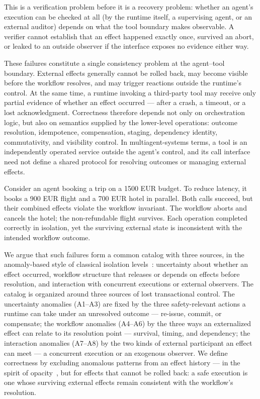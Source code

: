 \documentclass[runningheads]{comsis3}
\begin{document}
This is a verification problem before it is a recovery problem: whether an
agent's execution can be checked at all (by the runtime itself, a supervising agent, or an external auditor) depends on what the tool
boundary makes observable. A verifier cannot establish that an effect
happened exactly once, survived an abort, or leaked to an outside observer
if the interface exposes no evidence either way.

These failures constitute a single consistency problem at the agent--tool
boundary. External effects
generally cannot be rolled back, may become visible before the workflow
resolves, and may trigger reactions outside the runtime's control. At the
same time, a runtime invoking a third-party tool may receive only partial
evidence of whether an effect occurred --- after a crash, a timeout, or a
lost acknowledgment. Correctness therefore depends not only on
orchestration logic, but also on semantics supplied by the lower-level
operations: outcome resolution, idempotence, compensation, staging,
dependency identity, commutativity, and visibility control. In
multiagent-systems terms, a tool is an independently operated service
outside the agent's control, and its call interface need not define a
shared protocol for resolving outcomes or managing external effects.

Consider an agent booking a trip on a 1500 EUR budget. To reduce latency,
it books a 900 EUR flight and a 700 EUR hotel in parallel. Both calls
succeed, but their combined effects violate the workflow invariant. The
workflow aborts and cancels the hotel; the non-refundable flight survives.
Each operation completed correctly in isolation, yet the surviving external
state is inconsistent with the intended workflow outcome.

We argue that such failures form a common catalog with three sources, in
the anomaly-based style of classical isolation
levels~\cite{berenson1995critique,adya1999}: uncertainty about whether an
effect occurred, workflow structure that releases or depends on effects
before resolution, and interaction with concurrent executions or external
observers. The catalog is organized around three sources of lost
transactional control. The uncertainty anomalies (A1--A3) are fixed by the three
safety-relevant actions a runtime can take under an unresolved outcome ---
re-issue, commit, or compensate; the workflow anomalies (A4--A6) by the
three ways an externalized effect can relate to its resolution point ---
survival, timing, and dependency; the interaction anomalies (A7--A8) by the
two kinds of external participant an effect can meet --- a concurrent
execution or an exogenous observer. We define correctness by excluding
anomalous patterns from an
effect history --- in the spirit of opacity~\cite{guerraoui2008opacity},
but for effects that cannot be rolled back: a safe execution is one whose
surviving external effects remain consistent with the workflow's
resolution.
\end{document}

